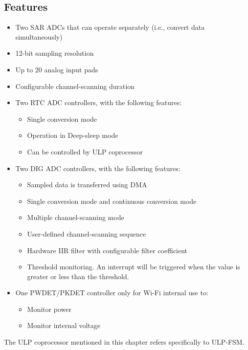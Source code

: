 \documentclass[main\_\_EN.tex]{subfiles}
\begin{document}
\subsection{Features}
\begin{itemize}
\item Two SAR ADCs that can operate separately (i.e., convert data simultaneously)
\item 12-bit sampling resolution
\item{Up to 20 analog input pads}
\item{Configurable channel-scanning duration}
\item{Two RTC ADC controllers, with the following features:}
    \begin{itemize}
        \item{Single conversion mode}
        \item{Operation in Deep-sleep mode}
        \item{Can be controlled by ULP coprocessor}
    \end{itemize}

\item{Two DIG ADC controllers, with the following features:}
    \begin{itemize}
        \item Sampled data is transferred using DMA
        \item Single conversion mode and continuous conversion mode
        \item{Multiple channel-scanning mode}
        \item{User-defined channel-scanning sequence}
        \item{Hardware IIR filter with configurable filter coefficient}
        \item{Threshold monitoring. An interrupt will be triggered when the value is greater or less than the threshold.}
    \end{itemize}
\item{One PWDET/PKDET controller only for Wi-Fi internal use to:}
    \begin{itemize}
        \item{Monitor power}
        \item{Monitor internal voltage}
    \end{itemize}
\end{itemize}

\begin{tiplisting}
The ULP coprocessor mentioned in this chapter refers specifically to ULP-FSM.
\end{tiplisting}
\end{document}
